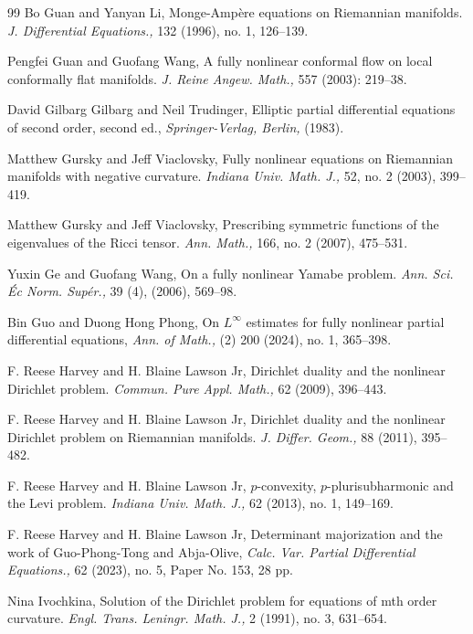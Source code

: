 \documentclass{article}
\theoremstyle{plain}
\theoremstyle{definition}
\theoremstyle{definition}
\numberwithin{equation}{section}
\begin{document}
\begin{sloppypar}
\begin{thebibliography}{99}
 Bo Guan and Yanyan Li, Monge-Amp\`ere equations on Riemannian manifolds. {\em J. Differential Equations.,} 132 (1996), no. 1, 126--139.

 

 Pengfei Guan and Guofang Wang, A fully nonlinear conformal flow on local conformally flat manifolds.  {\em J. Reine Angew. Math.,} 557 (2003): 219--38.


 David Gilbarg Gilbarg and Neil Trudinger, Elliptic partial differential equations of second order, second ed., 
{\em Springer-Verlag, Berlin,} (1983).

 Matthew Gursky and Jeff Viaclovsky, 
Fully nonlinear equations on Riemannian manifolds with
negative curvature.  {\em Indiana Univ. Math. J.,} 52, no. 2 (2003), 399--419.

 Matthew Gursky and Jeff Viaclovsky, Prescribing symmetric functions of the eigenvalues of the
Ricci tensor.  {\em Ann. Math.,} 166, no. 2 (2007), 475--531.

 Yuxin Ge and Guofang Wang, On a fully nonlinear Yamabe problem.
{\em Ann. Sci. \'Ec Norm. Sup\'er.,}
39 (4), (2006), 569--98.

 Bin Guo and Duong Hong  Phong, 
On $L^{\infty}$ estimates for fully nonlinear partial differential equations, {\em Ann. of Math.,} (2) 200 (2024), no. 1, 365--398.

 F. Reese Harvey and H. Blaine Lawson Jr, Dirichlet duality and the nonlinear Dirichlet problem. {\em Commun. Pure Appl. Math.,} 62 (2009), 396--443.

 F. Reese Harvey and H. Blaine Lawson Jr, Dirichlet duality and the nonlinear Dirichlet problem on Riemannian manifolds. {\em J. Differ. Geom.,} 88 (2011), 395--482.

 F. Reese Harvey and H. Blaine Lawson Jr, $p$-convexity, $p$-plurisubharmonic and the Levi problem.  {\em Indiana Univ. Math. J.,} 62 (2013), no. 1, 149--169.

 F. Reese Harvey and H. Blaine Lawson Jr, Determinant majorization and the work of Guo-Phong-Tong and Abja-Olive, {\em Calc. Var. Partial Differential Equations.,} 62 (2023), no. 5, Paper No. 153, 28 pp.


 
 Nina Ivochkina, Solution of the Dirichlet problem for equations of mth order curvature. {\em Engl. Trans. Leningr. Math. J.,} 2 (1991), no. 3, 631--654.


\end{thebibliography}
\end{sloppypar}
\end{document}
